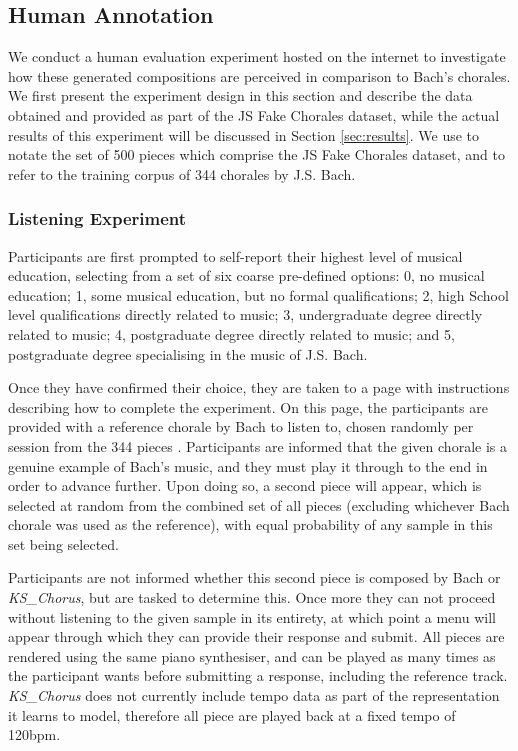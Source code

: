 \documentclass{article}
\begin{document}
\subsection{Human Annotation}\label{subsec:annotation}

We conduct a human evaluation experiment hosted on the internet to investigate how these generated compositions are perceived in comparison to Bach's chorales. We first present the experiment design in this section and describe the data obtained and provided as part of the JS Fake Chorales dataset, while the actual results of this experiment will be discussed in Section \ref{sec:results}. We use  to notate the set of 500 pieces which comprise the JS Fake Chorales dataset, and  to refer to the training corpus of 344 chorales by J.S. Bach.

\subsubsection{Listening Experiment}

Participants are first prompted to self-report their highest level of musical education, selecting from a set of six coarse pre-defined options: 0, no musical education; 1, some musical education, but no formal qualifications; 2, high School level qualifications directly related to music; 3, undergraduate degree directly related to music; 4, postgraduate degree directly related to music; and 5, postgraduate degree specialising in the music of J.S. Bach.
  
Once they have confirmed their choice, they are taken to a page with instructions describing how to complete the experiment. On this page, the participants are provided with a reference chorale by Bach to listen to, chosen randomly per session from the 344 pieces . Participants are informed that the given chorale is a genuine example of Bach's music, and they must play it through to the end in order to advance further. Upon doing so, a second piece will appear, which is selected at random from the combined set of all pieces  (excluding whichever Bach chorale was used as the reference), with equal probability of any sample in this set being selected.

Participants are not informed whether this second piece is composed by Bach or \textit{KS\_Chorus}, but are tasked to determine this. Once more they can not proceed without listening to the given sample in its entirety, at which point a menu will appear through which they can provide their response and submit. All pieces are rendered using the same piano synthesiser, and can be played as many times as the participant wants before submitting a response, including the reference track. \textit{KS\_Chorus} does not currently include tempo data as part of the representation it learns to model, therefore all piece are played back at a fixed tempo of 120bpm.
\end{document}
